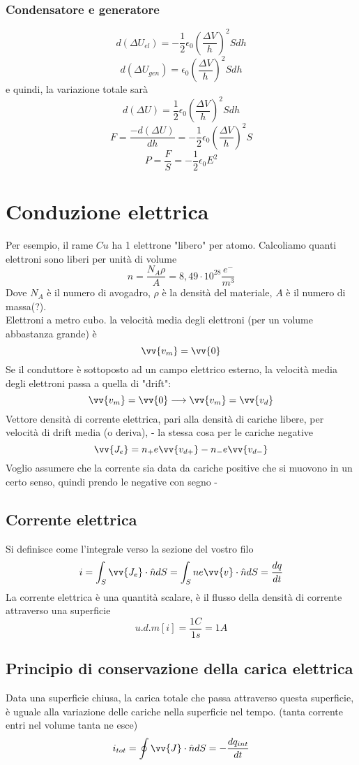 \documentclass[a4paper]{report}
\begin{document}
  \subsubsection{Condensatore e generatore}
  $$ d(\Delta U_{el}) = -\frac{1}{2} \epsilon_0 (\frac{\Delta V}{h})^2 S dh $$
  $$ d(\Delta U_{gen}) = \epsilon_0 (\frac{\Delta V}{h})^2 S dh $$
  e quindi, la variazione totale sarà
  $$ d(\Delta U) =\frac{1}{2} \epsilon_0 (\frac{\Delta V}{h})^2 S dh $$
  $$ F = \frac{-d(\Delta U)}{dh} = -\frac{1}{2} \epsilon_0 (\frac{\Delta V}{h})^2 S $$
  $$ P = \frac{F}{S} = -\frac{1}{2} \epsilon_0 E^2 $$

  \section{Conduzione elettrica}
  Per esempio, il rame $Cu$ ha 1 elettrone "libero" per atomo. Calcoliamo quanti elettroni sono liberi per unità di volume
  $$ n = \frac{N_A \rho}{ A} = 8,49 \cdot 10^{28} \frac{e^-}{m^3} $$
  Dove $N_A$ è il numero di avogadro, $\rho$ è la densità del materiale, $A$ è il numero di massa(?).\\
  Elettroni a metro cubo. la velocità media degli elettroni (per un volume abbastanza grande) è
  $$\vv{v_m} = \vv{0}$$
  Se il conduttore è sottoposto ad un campo elettrico esterno, la velocità media degli elettroni passa a quella di "drift":
  $$ \vv{v_m} = \vv{0} \longrightarrow \vv{v_m} = \vv{v_d} $$
  Vettore densità di corrente elettrica, pari alla densità di cariche libere, per velocità di drift media (o deriva), - la stessa cosa per le cariche negative
  $$ \vv{J_e} = n_+ e \vv{v_{d+}} - n_- e \vv{v_{d-}}$$
  Voglio assumere che la corrente sia data da cariche positive che si muovono in un certo senso, quindi prendo le negative con segno -

  \subsection{Corrente elettrica}
  Si definisce come l'integrale verso la sezione del vostro filo
  $$ i = \int_S \vv{J_e} \cdot \hat{n} dS = \int_S n e \vv{v} \cdot \hat{n} dS = \frac{dq}{dt}$$
  La corrente elettrica è una quantità scalare, è il flusso della densità di corrente attraverso una superficie
  $$ u.d.m[i]=\frac{1C}{1s}= 1A $$

  \subsection{Principio di conservazione della carica elettrica}
  Data una superficie chiusa, la carica totale che passa attraverso questa superficie, è uguale alla variazione delle cariche nella superficie nel tempo. (tanta corrente entri nel volume tanta ne esce)
  $$ i_{tot} = \oint \vv{J} \cdot \hat{n} dS = -\frac{dq_{int}}{dt} $$
\end{document}
